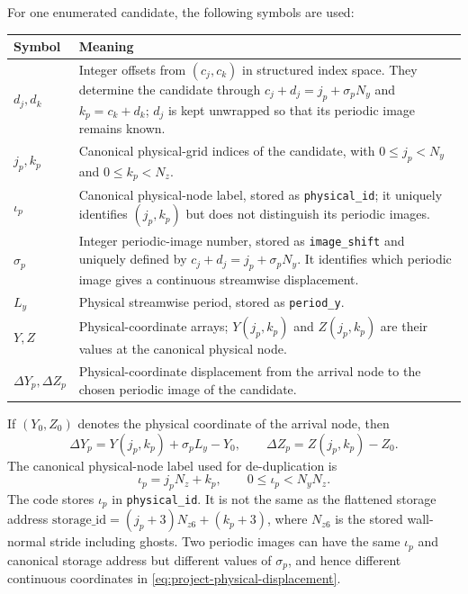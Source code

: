 \documentclass[11pt,a4paper]{article}
\begin{document}
For one enumerated candidate, the following symbols are used:
\begin{center}\small
\begin{tabularx}{\textwidth}{@{}P{2.6cm}X@{}}
\toprule
\textbf{Symbol} & \textbf{Meaning} \\
\midrule
$d_j,d_k$ & Integer offsets from $(c_j,c_k)$ in structured index space. They determine
the candidate through $c_j+d_j=j_p+\sigma_p N_y$ and $k_p=c_k+d_k$; $d_j$ is kept
unwrapped so that its periodic image remains known. \\
$j_p,k_p$ & Canonical physical-grid indices of the candidate, with
$0\le j_p<N_y$ and $0\le k_p<N_z$. \\
$\iota_p$ & Canonical physical-node label, stored as \texttt{physical\_id}; it uniquely
identifies $(j_p,k_p)$ but does not distinguish its periodic images. \\
$\sigma_p$ & Integer periodic-image number, stored as \texttt{image\_shift} and uniquely
defined by $c_j+d_j=j_p+\sigma_p N_y$. It identifies which periodic image gives a continuous
streamwise displacement. \\
$L_y$ & Physical streamwise period, stored as \texttt{period\_y}. \\
$Y,Z$ & Physical-coordinate arrays; $Y(j_p,k_p)$ and $Z(j_p,k_p)$ are their values at
the canonical physical node. \\
$\Delta Y_p,\Delta Z_p$ & Physical-coordinate displacement from the arrival node to the
chosen periodic image of the candidate. \\
\bottomrule
\end{tabularx}
\end{center}

If $(Y_0,Z_0)$ denotes the physical coordinate of the arrival node, then
\begin{equation}
 \Delta Y_p=Y(j_p,k_p)+\sigma_pL_y-Y_0,\qquad
 \Delta Z_p=Z(j_p,k_p)-Z_0.
\label{eq:project-physical-displacement}
\end{equation}
The canonical physical-node label used for de-duplication is
\begin{equation}
 \iota_p=j_pN_z+k_p,\qquad 0\le\iota_p<N_y N_z.
\label{eq:project-physical-id}
\end{equation}
The code stores $\iota_p$ in \texttt{physical\_id}. It is not the same as the flattened
storage address $\mathrm{storage\_id}=(j_p+3)N_{z6}+(k_p+3)$, where $N_{z6}$ is the
stored wall-normal stride including ghosts. Two periodic images can have the same
$\iota_p$ and canonical storage address but different values of $\sigma_p$, and hence
different continuous coordinates in \eqref{eq:project-physical-displacement}.
\end{document}
